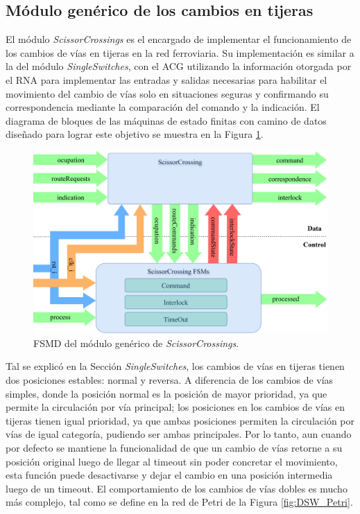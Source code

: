 \subsection{Módulo genérico de los cambios en tijeras}
	\label{sec:ACG_scr}
		
	El módulo \textit{ScissorCrossings} es el encargado de implementar el funcionamiento de los cambios de vías en tijeras en la red ferroviaria. Su implementación es similar a la del módulo \textit{SingleSwitches}, con el ACG utilizando la información otorgada por el RNA para implementar las entradas y salidas necesarias para habilitar el movimiento del cambio de vías solo en situaciones seguras y confirmando su correspondencia mediante la comparación del comando y la indicación. El diagrama de bloques de las máquinas de estado finitas con camino de datos diseñado para lograr este objetivo se muestra en la Figura \ref{fig:SCR_module}.
	
	\begin{figure}[H]
		\centering
		\includegraphics[width=1\textwidth]{Figuras/SCR_module}
		\centering\caption{FSMD del módulo genérico de \textit{ScissorCrossings}.}
		\label{fig:SCR_module}
	\end{figure}
	
	Tal se explicó en la Sección \textit{SingleSwitches}, los cambios de vías en tijeras tienen dos posiciones estables: normal y reversa. A diferencia de los cambios de vías simples, donde la posición normal es la posición de mayor prioridad, ya que permite la circulación por vía principal; los posiciones en los cambios de vías en tijeras tienen igual prioridad, ya que ambas posiciones permiten la circulación por vías de igual categoría, pudiendo ser ambas principales. Por lo tanto, aun cuando por defecto se mantiene la funcionalidad de que un cambio de vías retorne a su posición original luego de llegar al timeout sin poder concretar el movimiento, esta función puede desactivarse y dejar el cambio en una posición intermedia luego de un timeout. El comportamiento de los cambios de vías dobles es mucho más complejo, tal como se define en la red de Petri de la Figura \ref{fig:DSW_Petri}.
	
